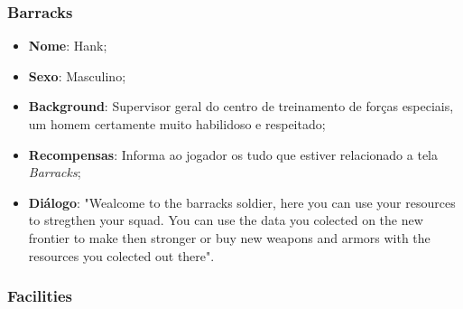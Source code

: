 \documentclass[11pt]{article} %
\begin{document}
\subsubsection{Barracks}

\begin{itemize}
  \item \textbf{Nome}: Hank;
  \item \textbf{Sexo}: Masculino;
  \item \textbf{Background}: Supervisor geral do centro de treinamento de forças especiais, um homem certamente muito habilidoso e respeitado;
  \item \textbf{Recompensas}: Informa ao jogador os tudo que estiver relacionado a tela \textit{Barracks};
  \item \textbf{Diálogo}: "Wealcome to the barracks soldier, here you can use your resources to stregthen your squad. You can use the data you colected on the new frontier to make then stronger or buy new weapons and armors with the resources you colected out there".
\end{itemize}

\subsubsection{Facilities}
\end{document}
